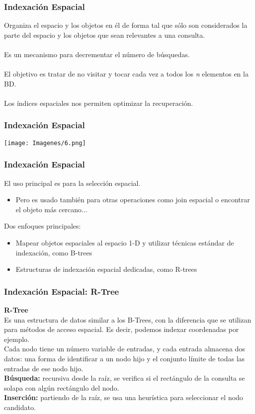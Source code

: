 \documentclass[12pt]{beamer}
\begin{document}
\begin{frame}
\frametitle{Indexaci\'on Espacial}

Organiza el espacio y los objetos en \'el de forma tal que s\'olo son considerados la parte del espacio y los objetos que sean relevantes a una consulta.\\
\ \\
Es un mecanismo para decrementar el n\'umero de b\'usquedas.\\
\ \\
El objetivo es tratar de no visitar y tocar cada vez a todos los \textit{n} elementos en la BD.\\
\ \\
Los \'indices espaciales nos permiten optimizar la recuperaci\'on.\\

\end{frame}

\begin{frame}
\frametitle{Indexaci\'on Espacial}
\texttt{[image: Imagenes/6.png]}
\end{frame}

\begin{frame}
\frametitle{Indexaci\'on Espacial}
El uso principal es para la selecci\'on espacial.\\
\begin{itemize}
\item Pero es usado tambi\'en para otras operaciones como join espacial o encontrar el objeto m\'as cercano...
\end{itemize}
Dos enfoques principales:
\begin{itemize}
\item Mapear objetos espaciales al espacio 1-D y utilizar t\'ecnicas est\'andar de indexaci\'on, como B-trees
\item Estructuras de indexaci\'on espacial dedicadas, como R-trees
\end{itemize}
\end{frame}

\begin{frame}
\frametitle{Indexaci\'on Espacial: R-Tree}
\textbf{R-Tree}\\
Es una estructura de datos similar a los B-Trees, con la diferencia que se utilizan para m\'etodos de acceso espacial. Es decir, podemos indexar coordenadas por ejemplo.\\
Cada nodo tiene un n\'umero variable de entradas, y cada entrada almacena dos datos: una forma de identificar a un nodo hijo y el conjunto l\'imite de todas las entradas de ese nodo hijo.\\
\textbf{B\'usqueda:} recursiva desde la ra\'iz, se verifica si el rect\'angulo de la consulta se solapa con alg\'un rect\'angulo del nodo.\\
\textbf{Inserci\'on:} partiendo de la ra\'iz, se usa una heur\'istica para seleccionar el nodo candidato.
\end{frame}
\end{document}
